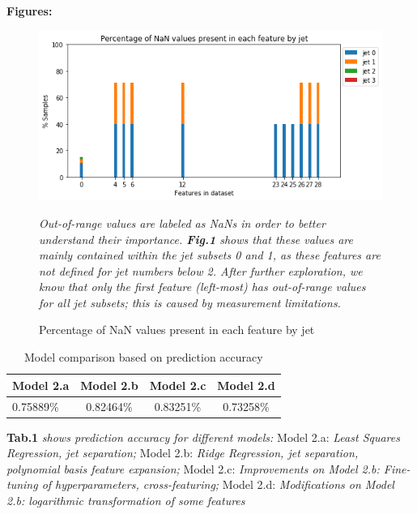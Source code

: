 \documentclass[10pt,a4paper]{article}
\begin{document}
\vspace*{0cm}
\normalsize{\textbf{Figures:}}
\vspace*{0cm}
\begin{figure}[H]
\begin{center}
\includegraphics[scale=0.45, trim=0cm 0cm 0cm 0cm, clip=true]{nanCount2.png}
\caption{\label{Fig.1}Percentage of NaN values present in each feature by jet}
\end{center}
\textit{\footnotesize{Out-of-range values are labeled as NaNs in order to better understand their importance. \textbf{Fig.1} shows that these values are mainly contained within the jet subsets 0 and 1, as these features are not defined for jet numbers below 2. After further exploration, we know that only the first feature (left-most) has out-of-range values for all jet subsets; this is caused by measurement limitations.}}
\end{figure}
\vspace*{0.20cm}

 	 	
\begin{table}[hbtp]
\begin{center}
\begin{tabular}{l|c|c|c}
\textbf{Model 2.a} & \textbf{Model 2.b} & \textbf{Model 2.c} & \textbf{Model 2.d} \\
\midrule
0.75889\% & 0.82464\% & 0.83251\% & 0.73258\% \\
\end{tabular}
\caption{\label{Tab.1}Model comparison based on prediction accuracy}
\end{center}
\footnotesize{\textbf{Tab.1} \textit{shows prediction accuracy for different models:}
Model 2.a: \textit{Least Squares Regression, jet separation;}
Model 2.b: \textit{Ridge Regression, jet separation, polynomial basis feature expansion;}
Model 2.c: \textit{Improvements on Model 2.b: Fine-tuning of hyperparameters, cross-featuring;}
Model 2.d: \textit{Modifications on Model 2.b: logarithmic transformation of some features}}
\end{table}
\vspace*{0.20cm}
\end{document}
